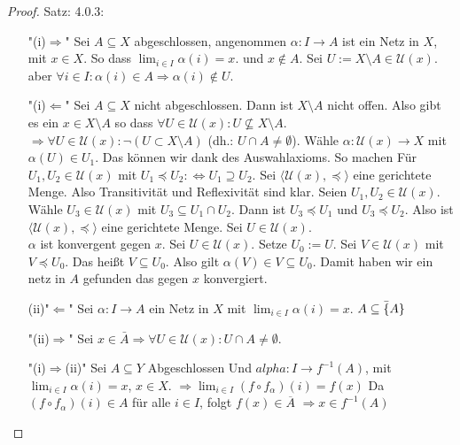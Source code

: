 \begin{proof}{Satz: 4.0.3:}\\
    \begin{itemize}
        \item["(i)$\Rightarrow$"]
        Sei $A \subseteq X$ abgeschlossen, 
        angenommen $\alpha : I \to A$ ist ein Netz in $X$, mit $x \in X$.
        So dass $\lim_{i \in I} \alpha(i) = x$. und $x \notin A$.
        Sei $U := X \setminus A \in \mathcal{U}(x)$.
        aber $\forall i \in I : \alpha(i) \in A \Rightarrow \alpha(i) \notin U$.
        \item["(i)$\Leftarrow$"]
        Sei $A \subseteq X$ nicht abgeschlossen. 
        Dann ist $X \setminus A$ nicht offen. 
        Also gibt es ein $x \in X \setminus A$ so dass 
        $\forall U \in \mathcal{U}(x) : U \not\subseteq X \setminus A$.
        $\Rightarrow \forall U \in \mathscr{U}(x) : \neg (U \subset X \setminus A)$
        (dh.: $U \cap A \neq \emptyset$).
        Wähle $\alpha : \mathscr{U}(x) \to X$ mit $\alpha(U) \in U_1 $.
        Das können wir dank des Auswahlaxioms. So machen
        Für $U_1, U_2 \in \mathscr{U}(x)$ mit $U_1 \preceq U_2 : \Leftrightarrow U_1 \supseteq U_2$.
        Sei $\langle \mathscr{U}(x), \preceq \rangle$ eine gerichtete Menge.
        Also Transitivität und Reflexivität sind klar.
        Seien $U_1, U_2 \in \mathscr{U}(x)$.
        Wähle $U_3 \in \mathscr{U}(x)$ mit $U_3 \subseteq U_1 \cap U_2$.
        Dann ist $U_3 \preceq U_1$ und $U_3 \preceq U_2$.
        Also ist $\langle \mathscr{U}(x), \preceq \rangle$ eine gerichtete Menge.
        Sei $U \in \mathscr{U}(x)$.\\
        $\alpha$ ist konvergent gegen $x$.
        Sei $U \in \mathscr{U}(x)$. Setze $U_0 := U$.
        Sei $V \in \mathscr{U}(x)$ mit $V \preceq U_0$.
        Das heißt $V \subseteq U_0$.
        Also gilt $\alpha(V) \in V \subseteq U_0$.
        Damit haben wir ein netz in $A$ gefunden das gegen $x$ konvergiert.
        \item[(ii)"$\Leftarrow$"]
        Sei $\alpha : I \to A$ ein Netz in $X$ mit $\lim_{i \in I} \alpha(i) = x$.
        $A \subseteq \bar \{A\}$
        \item["(ii)$\Rightarrow$"]
        Sei $x \in  \bar{A} \Rightarrow 
        \forall U \in \mathcal{U}(x) : U \cap A \neq \emptyset$.
        \item["(i)$\Rightarrow$(ii)"]
        Sei $A \subseteq Y$ Abgeschlossen 
        Und $alpha : I \to f^{-1}(A)$, 
        mit $\lim_{i \in I} \alpha(i) = x$, $x \in X$.
        $\Rightarrow \lim_{i \in I} (f \circ f_\alpha)(i) = f(x)$
        Da $(f \circ f_\alpha)(i) \in A$ für alle $i \in I$, folgt  
        $f(x) \in \overline{A}$
        $\Rightarrow  x \in f^{-1}(A)$
        \end{itemize}
        
\end{proof}
